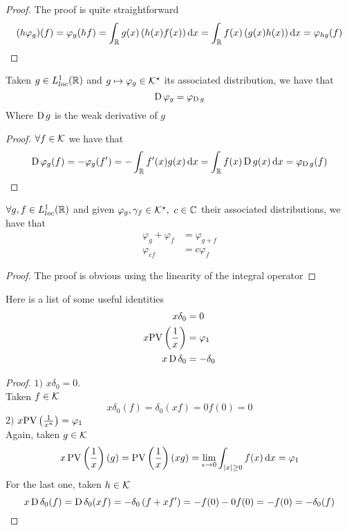\documentclass[../complete.tex]{subfiles}
\begin{document}
\begin{proof}
	The proof is quite straightforward
	\begin{equation*}
		(h\varphi_g)(f)=\varphi_g(hf)=\int_{\mathbb{R}}^{}g(x)\left( h(x)f(x) \right)\operatorname{d\!} x=\int_{\mathbb{R}}^{}f(x)\left( g(x)h(x) \right)\operatorname{d\!} x=\varphi_{hg}(f)
	\end{equation*}
\end{proof}
\begin{thm}
	Taken $g\in L^1_{loc}(\mathbb{R})$ and $g\mapsto\varphi_g\in\mathcal{K}^\star$ its associated distribution, we have that
	\begin{equation*}
		\operatorname{\mathrm{D}}\varphi_g=\varphi_{\operatorname{\mathrm{D}} g}
	\end{equation*}
	Where $\operatorname{\mathrm{D}} g$ is the weak derivative of $g$
\end{thm}
\begin{proof}
	$\forall f\in\mathcal{K}$ we have that
	\begin{equation*}
		\operatorname{\mathrm{D}}\varphi_g(f)=-\varphi_g(f')=-\int_{\mathbb{R}}^{}f'(x)g(x)\operatorname{d\!} x=\int_{\mathbb{R}}^{}f(x)\operatorname{\mathrm{D}} g(x)\operatorname{d\!} x=\varphi_{\operatorname{\mathrm{D}} g}(f)
	\end{equation*}
\end{proof}
\begin{thm}
	$\forall g,f\in L^1_{loc}(\mathbb{R})$ and given $\varphi_g,\gamma_f\in\K^\star,\ c\in\Cf$ their associated distributions, we have that
	\begin{equation*}
		\begin{aligned}
			\varphi_g+\varphi_f&=\varphi_{g+f}\\
			\varphi_{cf}&=c\varphi_f
		\end{aligned}
	\end{equation*}
\end{thm}
\begin{proof}
	The proof is obvious using the linearity of the integral operator
\end{proof}
\begin{thm}
	Here is a list of some useful identities
	\begin{equation}
		\begin{aligned}
			x\delta_0&=0\\
			x\cpvdist[]&=\varphi_1\\
			x\D\delta_0&=-\delta_0
		\end{aligned}
		\label{eq:distitent}
	\end{equation}
\end{thm}
\begin{proof}
	$1)$ $x\delta_0=0$.\\
	Taken $f\in\mathcal{K}$
	\begin{equation*}
		x\delta_0(f)=\delta_0(xf)=0f(0)=0
	\end{equation*}
	$2)$ $x\mathrm{PV}\left( \frac{1}{x^{n}} \right)=\varphi_1$\\
	Again, taken $g\in\mathcal{K}$
	\begin{equation*}
		x\operatorname{\mathrm{PV}}\left( \frac{1}{x} \right)(g)=\operatorname{\mathrm{PV}}\left( \frac{1}{x} \right)(xg)=\lim_{\epsilon\to0}\int_{\abs{x}\ge0}^{}f(x)\operatorname{d\!} x=\varphi_1
	\end{equation*}
	For the last one, taken $h\in\mathcal{K}$
	\begin{equation*}
		x\operatorname{\mathrm{D}}\delta_0(f)=\operatorname{\mathrm{D}}\delta_0(xf)=-\delta_0\left( f+xf' \right)=-f(0)-0f(0)=-f(0)=-\delta_0(f)
	\end{equation*}
\end{proof}
\end{document}
